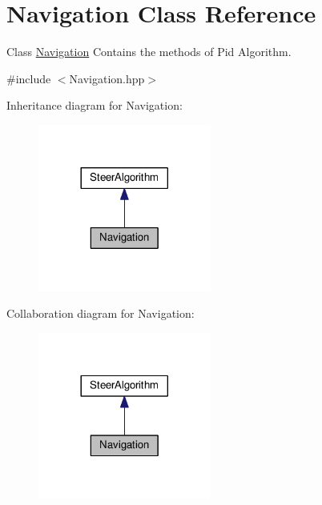 \hypertarget{class_navigation}{}\section{Navigation Class Reference}
\label{class_navigation}


Class \hyperlink{class_navigation}{Navigation} Contains the methods of Pid Algorithm.  




{\ttfamily \#include $<$Navigation.\+hpp$>$}



Inheritance diagram for Navigation\+:
\nopagebreak
\begin{figure}[H]
\begin{center}
\leavevmode
\includegraphics[width=161pt]{class_navigation__inherit__graph}
\end{center}
\end{figure}


Collaboration diagram for Navigation\+:
\nopagebreak
\begin{figure}[H]
\begin{center}
\leavevmode
\includegraphics[width=161pt]{class_navigation__coll__graph}
\end{center}
\end{figure}
